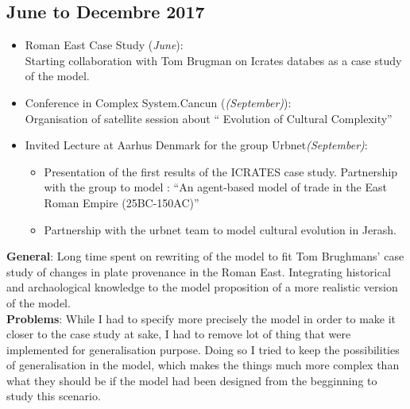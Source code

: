 \documentclass[a4paper]{article}
\begin{document}
\subsection*{June to Decembre 2017}
	\begin{itemize}
        \item Roman East Case Study (\emph{June}):\\ \hspace{.2cm}Starting collaboration with Tom Brugman on Icrates databes as a case study of the model.
        \item Conference in Complex System.Cancun (\emph{(September)}):\\ \hspace{.2cm}Organisation of satellite session about `` Evolution of Cultural Complexity'' 
	    \item Invited Lecture at Aarhus Denmark for the group Urbnet\emph{(September)}:
            \begin{itemize}
                \item  Presentation of the first results of the ICRATES case study. Partnership with the group to model : ``An agent-based model of trade in the East Roman Empire (25BC-150AC)''
                \item Partnership with the urbnet team to model cultural evolution in Jerash.
            \end{itemize}
	\end{itemize}

	{\small
	\noindent \textbf{General}: Long time spent on rewriting of the model to fit Tom Brughmans' case study of changes in plate provenance in the Roman East. Integrating historical and archaological knowledge to the model proposition of a more realistic version of the model.\\
	    \textbf{Problems}: While I had to specify more precisely the model in order to make it closer to the case study at sake, I had to remove lot of thing that were implemented for generalisation purpose. Doing so I tried to keep the possibilities of generalisation in the model, which makes the things much more complex than what they should be if the model had been designed from the begginning to study this scenario. 
	}
\end{document}
